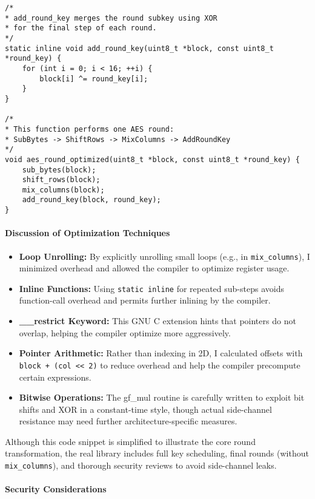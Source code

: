 \begin{lstlisting}
/*
* add_round_key merges the round subkey using XOR 
* for the final step of each round.
*/
static inline void add_round_key(uint8_t *block, const uint8_t *round_key) {
	for (int i = 0; i < 16; ++i) {
		block[i] ^= round_key[i];
	}
}

/*
* This function performs one AES round:
* SubBytes -> ShiftRows -> MixColumns -> AddRoundKey
*/
void aes_round_optimized(uint8_t *block, const uint8_t *round_key) {
	sub_bytes(block);
	shift_rows(block);
	mix_columns(block);
	add_round_key(block, round_key);
}
\end{lstlisting}

\paragraph{Discussion of Optimization Techniques}

\begin{itemize}
	\item \textbf{Loop Unrolling:} By explicitly unrolling small loops (e.g., in \texttt{mix\_columns}), I minimized overhead and allowed the compiler to optimize register usage.
	\item \textbf{Inline Functions:} Using \texttt{static inline} for repeated sub-steps avoids function-call overhead and permits further inlining by the compiler.
	\item \textbf{\_\_restrict Keyword:} This GNU C extension hints that pointers do not overlap, helping the compiler optimize more aggressively.
	\item \textbf{Pointer Arithmetic:} Rather than indexing in 2D, I calculated offsets with \texttt{block + (col << 2)} to reduce overhead and help the compiler precompute certain expressions.
	\item \textbf{Bitwise Operations:} The gf\_mul routine is carefully written to exploit bit shifts and XOR in a constant-time style, though actual side-channel resistance may need further architecture-specific measures.
\end{itemize}

Although this code snippet is simplified to illustrate the core round transformation, the real library includes full key scheduling, final rounds (without \texttt{mix\_columns}), and thorough security reviews to avoid side-channel leaks.

\paragraph{Security Considerations}

